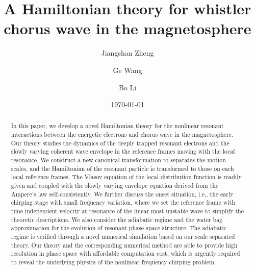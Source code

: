 \documentclass[showkeys,preprint]{revtex4-2}
\begin{document}
\title{A Hamiltonian theory for whistler chorus wave in the magnetosphere}
\author{Jiangshan Zheng}
\author{Ge Wang}
\author{Bo Li}
\date{\today}
\begin{abstract}
In this paper, we develop a novel Hamiltonian theory for the nonlinear resonant interactions between the energetic electrons and chorus wave in the magnetosphere.
Our theory studies the dynamics of the deeply trapped resonant electrons and the slowly varying coherent wave envelope in the reference frames moving with the local resonance.
We construct a new canonical transformation to separates the motion scales, and the Hamiltonian of the resonant particle is transformed to those on each local reference frames.
The Vlasov equation of the local distribution function is readily given and coupled with the slowly varying envelope equation derived from the Ampere's law self-consistently.
We further discuss the onset situation, i.e., the early chirping stage with small frequency variation, where we set the reference frame with time independent velocity at resonance of the linear most unstable wave to simplify the theoretic descriptions. 
We also consider the adiabatic regime and the water bag approximation for the evolution of resonant phase space structure.
The adiabatic regime is verified through a novel numerical simulation based on our scale separated theory.
Our theory and the corresponding numerical method are able to provide high resolution in phase space with affordable computation cost, which is urgently required to reveal the underlying physics of the nonlinear frequency chirping problem.
\end{abstract}
\maketitle









%

\end{document}
